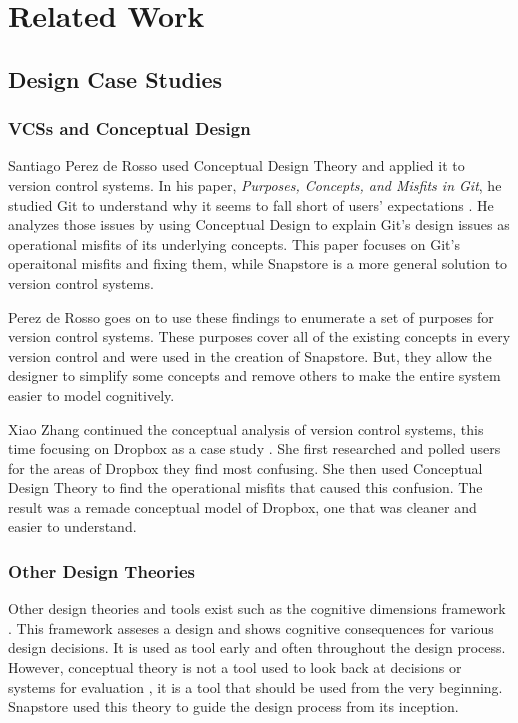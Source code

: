 \chapter{Related Work}

\section{Design Case Studies}

\subsection{VCSs and Conceptual Design}

Santiago Perez de Rosso used Conceptual Design Theory and applied it to version control systems. In his paper, \textit{Purposes, Concepts, and Misfits in Git}, he studied Git to understand why it seems to fall short of users' expectations \cite{Rosso}. He analyzes those issues by using Conceptual Design to explain Git's design issues as operational misfits of its underlying concepts. This paper focuses on Git's operaitonal misfits and fixing them, while Snapstore is a more general solution to version control systems.

Perez de Rosso goes on to use these findings to enumerate a set of purposes for version control systems. These purposes cover all of the existing concepts in every version control and were used in the creation of Snapstore. But, they allow the designer to simplify some concepts and remove others to make the entire system easier to model cognitively. 

Xiao Zhang continued the conceptual analysis of version control systems, this time focusing on Dropbox as a case study \cite{Zhang}. She first researched and polled users for the areas of Dropbox they find most confusing. She then used Conceptual Design Theory to find the operational misfits that caused this confusion. The result was a remade conceptual model of Dropbox, one that was cleaner and easier to understand.

\subsection{Other Design Theories}

Other design theories and tools exist such as the cognitive dimensions framework \cite{Green}. This framework asseses a design and shows cognitive consequences for various design decisions. It is used as tool early and often throughout the design process. However, conceptual theory is not a tool used to look back at decisions or systems for evaluation \cite{Jackson}, it is a tool that should be used from the very beginning. Snapstore used this theory to guide the design process from its inception.

